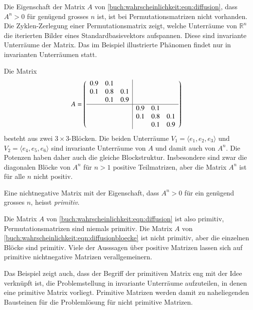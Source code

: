 Die Eigenschaft der Matrix $A$ von
\eqref{buch:wahrscheinlichkeit:eqn:diffusion}, dass $A^n>0$
für genügend grosses $n$ ist, ist bei Permutationsmatrizen nicht
vorhanden.
Die Zyklen-Zerlegung einer Permutationsmatrix zeigt, welche
Unterräume von $\mathbb{R}^n$ die iterierten Bilder eines
Standardbasisvektors aufspannen.
Diese sind invariante Unterräume der Matrix.
Das im Beispiel illustrierte Phänomen findet nur in invarianten
Unterräumen statt.

\begin{beispiel}
Die Matrix
\begin{equation}
A=\left(\begin{array}{ccc|ccc}
0.9&0.1&   &   &   &   \\
0.1&0.8&0.1&   &   &   \\
   &0.1&0.9&   &   &   \\
\hline
   &   &   &0.9&0.1&   \\
   &   &   &0.1&0.8&0.1\\
   &   &   &   &0.1&0.9
\end{array}
\right)
\label{buch:wahrscheinlichkeit:eqn:diffusionbloecke}
\end{equation}
besteht aus zwei $3\times 3$-Blöcken.
Die beiden Unterräume $V_1=\langle e_1,e_2,e_3\rangle$
und $V_2=\langle e_4,e_5,e_6\rangle$ sind invariante
Unterräume von $A$ und damit auch von $A^n$.
Die Potenzen haben daher auch die gleiche Blockstruktur.
Insbesondere sind zwar die diagonalen Blöcke von $A^n$ für $n>1$ positive
Teilmatrizen, aber die Matrix $A^n$ ist für alle $n$ nicht positiv.
\end{beispiel}

\begin{definition}
\label{buch:positiv:def:primitiv}
Eine nichtnegative Matrix mit der Eigenschaft, dass $A^n>0$ für
ein genügend grosses $n$, heisst {\em primitiv}.
%
\end{definition}

Die Matrix $A$ von \eqref{buch:wahrscheinlichkeit:eqn:diffusion}
ist also primitiv, Permutationsmatrizen sind niemals primitiv.
Die Matrix $A$ von \eqref{buch:wahrscheinlichkeit:eqn:diffusionbloecke}
ist nicht primitiv, aber die einzelnen Blöcke sind primitiv.
Viele der Ausssagen über positive Matrizen lassen sich auf primitive
nichtnegative Matrizen verallgemeinern.

Das Beispiel zeigt auch, dass der Begriff der primitiven Matrix 
eng mit der Idee verknüpft ist, die Problemstellung in invariante
Unterräume aufzuteilen, in denen eine primitive Matrix vorliegt.
Primitive Matrizen werden damit zu naheliegenden Bausteinen für
die Problemlösung für nicht primitive Matrizen.


